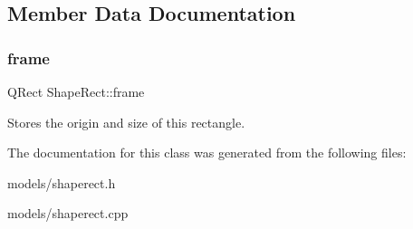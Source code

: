 \subsection{Member Data Documentation}
\mbox{\label{class_shape_rect_a238099eccd2cd32a7e82cb1719b36b51}} 
\subsubsection{\texorpdfstring{frame}{frame}}
{\footnotesize\ttfamily Q\+Rect Shape\+Rect\+::frame}

Stores the origin and size of this rectangle. 

The documentation for this class was generated from the following files\+:\begin{DoxyCompactItemize}
\item 
models/shaperect.\+h\item 
models/shaperect.\+cpp\end{DoxyCompactItemize}
